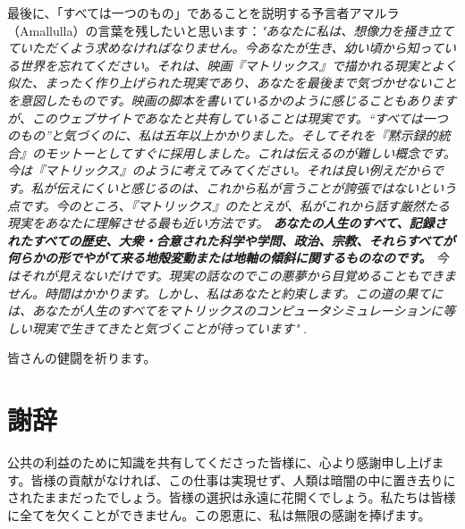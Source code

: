 \documentclass[10pt,twocolumn,letterpaper]{article}
\begin{document}
最後に、「すべては一つのもの」であることを説明する予言者アマルラ（Amallulla）の言葉を残したいと思います：\textit{"あなたに私は、想像力を掻き立てていただくよう求めなければなりません。今あなたが生き、幼い頃から知っている世界を忘れてください。それは、映画『マトリックス』で描かれる現実とよく似た、まったく作り上げられた現実であり、あなたを最後まで気づかせないことを意図したものです。映画の脚本を書いているかのように感じることもありますが、このウェブサイトであなたと共有していることは現実です。“すべては一つのもの”と気づくのに、私は五年以上かかりました。そしてそれを『黙示録的統合』のモットーとしてすぐに採用しました。これは伝えるのが難しい概念です。今は『マトリックス』のように考えてみてください。それは良い例えだからです。私が伝えにくいと感じるのは、これから私が言うことが誇張ではないという点です。今のところ、『マトリックス』のたとえが、私がこれから話す厳然たる現実をあなたに理解させる最も近い方法です。 \textbf{あなたの人生のすべて、記録されたすべての歴史、大衆・合意された科学や学問、政治、宗教、それらすべてが何らかの形でやがて来る地殻変動または地軸の傾斜に関するものなのです。} 今はそれが見えないだけです。現実の話なのでこの悪夢から目覚めることもできません。時間はかかります。しかし、私はあなたと約束します。この道の果てには、あなたが人生のすべてをマトリックスのコンピュータシミュレーションに等しい現実で生きてきたと気づくことが待っています"} \cite{33,34}.

皆さんの健闘を祈ります。

\section{謝辞}

公共の利益のために知識を共有してくださった皆様に、心より感謝申し上げます。皆様の貢献がなければ、この仕事は実現せず、人類は暗闇の中に置き去りにされたままだったでしょう。皆様の選択は永遠に花開くでしょう。私たちは皆様に全てを欠くことができません。この恩恵に、私は無限の感謝を捧げます。

\clearpage
\twocolumn

{\small
\renewcommand{\refname}{参考文献}


}
\end{document}

